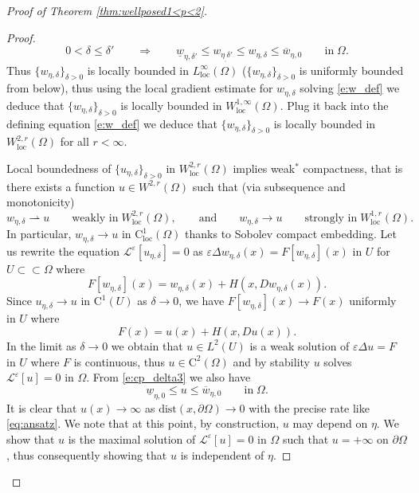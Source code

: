 \documentclass[11pt,reqno]{amsart}
\numberwithin{figure}{section}
\theoremstyle{plain}
\theoremstyle{remark}
\numberwithin{equation}{section}
\newcommand{\rup}{\rightharpoonup}
\begin{document}
\begin{appendices}
\begin{proof} [Proof of Theorem \ref{thm:wellposed1<p<2}]
\begin{proof}
    \begin{equation}\label{e:cp_delta3}
        0<\delta \leq \delta'\qquad\Longrightarrow\qquad \underline{w}_{\eta,\delta'} \leq w_{\eta_,\delta'}\leq w_{\eta,\delta} \leq \overline{w}_{\eta,0} \qquad\text{in}\;\Omega.
    \end{equation}
    Thus $\{w_{\eta,\delta}\}_{\delta>0}$ is locally bounded in $L^{\infty}_{\mathrm{loc}}(\Omega)$ ($\{w_{\eta,\delta}\}_{\delta>0}$ is uniformly bounded from below), thus using the local gradient estimate for $w_{\eta,\delta}$ solving \eqref{e:w_def} we deduce that $\{w_{\eta,\delta}\}_{\delta>0}$ is locally bounded in $W^{1,\infty}_{\mathrm{loc}}(\Omega)$. Plug it back into the defining equation \eqref{e:w_def} we deduce that $\{w_{\eta,\delta}\}_{\delta>0}$ is locally bounded in $W^{2,r}_{\mathrm{loc}}(\Omega)$ for all $r<\infty$.
    
    \noindent Local boundedness of $\{u_{\eta,\delta}\}_{\delta>0}$ in $W^{2,r}_{\mathrm{loc}}(\Omega)$ implies weak$^*$ compactness, that is there exists a function $u\in W^{2,r}(\Omega)$ such that (via subsequence and monotonicity)
    \begin{equation*}
        w_{\eta,\delta} \rup u \qquad\text{weakly in}\;W^{2,r}_{\mathrm{loc}}(\Omega),\qquad \text{and}\qquad
        w_{\eta,\delta} \to u \qquad\text{strongly in}\;W^{1,r}_{\mathrm{loc}}(\Omega).
    \end{equation*}
    In particular, $w_{\eta,\delta}\to u$ in $\mathrm{C}^1_{\mathrm{loc}}(\Omega)$ thanks to Sobolev compact embedding. Let us rewrite the equation $\mathcal{L}^\varepsilon\left[u_{\eta,\delta}\right] = 0$ as $\varepsilon\Delta w_{\eta,\delta}(x) = F[w_{\eta,\delta}](x)$ in $U$ for $U\subset\subset \Omega$ where
    \begin{equation*}
        F[w_{\eta,\delta}](x) =    w_{\eta,\delta}(x) + H(x,Dw_{\eta,\delta}(x)).
    \end{equation*}
    Since $u_{\eta,\delta}\to u$ in $\mathrm{C}^1(U)$ as $\delta\to 0$, we have $F[w_{\eta,\delta}](x) \to F(x)$ uniformly in $U$ where 
    \begin{equation*}
        F(x) =   u(x) + H(x,Du(x)).
    \end{equation*}
    In the limit as $\delta\to 0$ we obtain that $u\in L^2(U)$ is a weak solution of $\varepsilon\Delta u = F$ in $U$ where $F$ is continuous, thus $u\in \mathrm{C}^2(\Omega)$ and by stability $u$ solves $\mathcal{L}^\varepsilon[u] = 0$ in $\Omega$. From \eqref{e:cp_delta3} we also have
    \begin{equation*}
        \underline{w}_{\eta,0} \leq u \leq \overline{w}_{\eta,0} \qquad\text{in}\;\Omega.
    \end{equation*}
    It is clear that $u(x)\to \infty$ as $\mathrm{dist}(x,\partial\Omega)\to 0$ with the precise rate like \eqref{eq:ansatz}. We note that at this point, by construction, $u$ may depend on $\eta$. We show that $u$ is the maximal solution of $\mathcal{L}^\varepsilon[u] = 0$ in $\Omega$ such that $u = +\infty$ on $\partial\Omega$, thus consequently showing that $u$ is independent of $\eta$.
    

\end{proof}
\end{proof}
\end{appendices}
\end{document}
